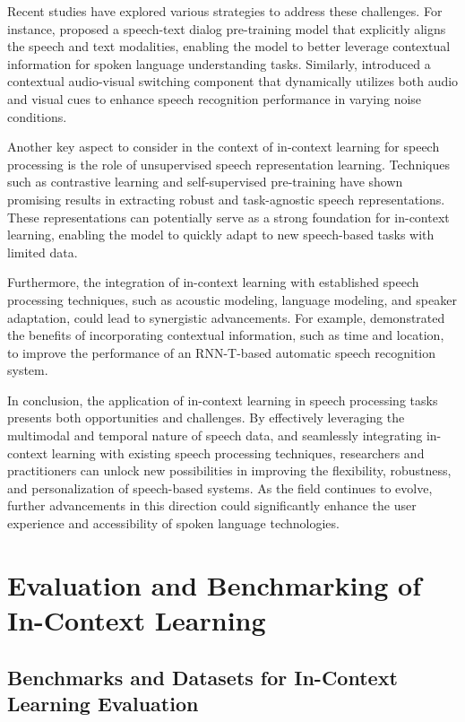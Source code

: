 \documentclass[11pt]{article}
\begin{document}
Recent studies have explored various strategies to address these challenges. For instance, \cite{ref274} proposed a speech-text dialog pre-training model that explicitly aligns the speech and text modalities, enabling the model to better leverage contextual information for spoken language understanding tasks. Similarly, \cite{ref275} introduced a contextual audio-visual switching component that dynamically utilizes both audio and visual cues to enhance speech recognition performance in varying noise conditions.

Another key aspect to consider in the context of in-context learning for speech processing is the role of unsupervised speech representation learning. Techniques such as contrastive learning \cite{ref270} and self-supervised pre-training \cite{ref276} have shown promising results in extracting robust and task-agnostic speech representations. These representations can potentially serve as a strong foundation for in-context learning, enabling the model to quickly adapt to new speech-based tasks with limited data.

Furthermore, the integration of in-context learning with established speech processing techniques, such as acoustic modeling, language modeling, and speaker adaptation, could lead to synergistic advancements. For example, \cite{ref277} demonstrated the benefits of incorporating contextual information, such as time and location, to improve the performance of an RNN-T-based automatic speech recognition system.

In conclusion, the application of in-context learning in speech processing tasks presents both opportunities and challenges. By effectively leveraging the multimodal and temporal nature of speech data, and seamlessly integrating in-context learning with existing speech processing techniques, researchers and practitioners can unlock new possibilities in improving the flexibility, robustness, and personalization of speech-based systems. As the field continues to evolve, further advancements in this direction could significantly enhance the user experience and accessibility of spoken language technologies.

\section{Evaluation and Benchmarking of In-Context Learning}

\subsection{Benchmarks and Datasets for In-Context Learning Evaluation}
\end{document}
